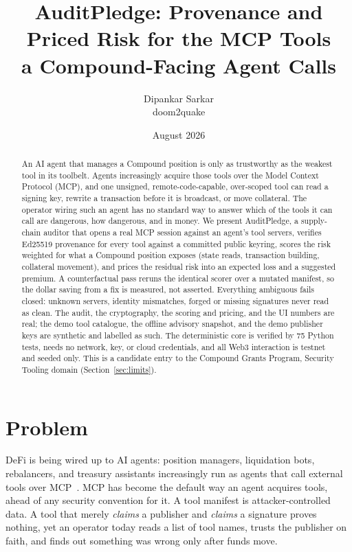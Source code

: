 \documentclass[11pt]{article}
\title{AuditPledge: Provenance and Priced Risk for the MCP Tools\\ a Compound-Facing Agent Calls}
\author{Dipankar Sarkar \\ \small doom2quake}
\date{August 2026}
\begin{document}
\maketitle

\begin{abstract}
An AI agent that manages a Compound position is only as trustworthy as the weakest tool in
its toolbelt. Agents increasingly acquire those tools over the Model Context Protocol (MCP),
and one unsigned, remote-code-capable, over-scoped tool can read a signing key, rewrite a
transaction before it is broadcast, or move collateral. The operator wiring such an agent has
no standard way to answer which of the tools it can call are dangerous, how dangerous, and in
money. We present AuditPledge, a supply-chain auditor that opens a real MCP session against an
agent's tool servers, verifies Ed25519 provenance for every tool against a committed public
keyring, scores the risk weighted for what a Compound position exposes (state reads,
transaction building, collateral movement), and prices the residual risk into an expected loss
and a suggested premium. A counterfactual pass reruns the identical scorer over a mutated
manifest, so the dollar saving from a fix is measured, not asserted. Everything ambiguous fails
closed: unknown servers, identity mismatches, forged or missing signatures never read as clean.
The audit, the cryptography, the scoring and pricing, and the UI numbers are real; the demo
tool catalogue, the offline advisory snapshot, and the demo publisher keys are synthetic and
labelled as such. The deterministic core is verified by 75 Python tests, needs no network, key,
or cloud credentials, and all Web3 interaction is testnet and seeded only. This is a candidate
entry to the Compound Grants Program, Security Tooling domain (Section~\ref{sec:limits}).
\end{abstract}

\section{Problem}
DeFi is being wired up to AI agents: position managers, liquidation bots, rebalancers, and
treasury assistants increasingly run as agents that call external tools over
MCP~\cite{mcp}. MCP has become the default way an agent acquires tools, ahead of any security
convention for it. A tool manifest is attacker-controlled data. A tool that merely
\emph{claims} a publisher and \emph{claims} a signature proves nothing, yet an operator today
reads a list of tool names, trusts the publisher on faith, and finds out something was wrong
only after funds move.
\end{document}
